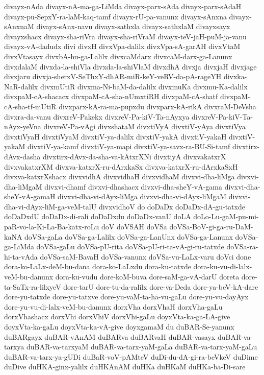 {divayx-nAda
divayx-nA-ma-ga-LiMda
divayx-parx-sAda
divayx-parx-sAdaH
divayx-pu-SepxY-ra-laM-kaq-tamf
divayx-rU-pa-vanunx
divayx-sAnxna
divayx-sAnxnaM
divayx-sAnx-navu
divayx-sathxla
divayx-sathxlaM
divayxsayx
divayxshacx
divayx-sha-riVra
divayx-sha-riVraM
divayx-teV-jaH-puM-ja-vanu
divayx-vA-dadudx
divi
divxH
divxVpa-dalilx
divxVpa-sA-garAH
divxVtaM
divxVtasayx
divxbA-hu-ga-Lalilx
divxcaMdarx
divxcaM-darx-ga-Lanunx
divxdalaM
divxda-la-shiVla
divxda-la-shiVlaM
divxdhA
divxja
divxjaH
divxjage
divxjaru
divxja-sherxV-SeThxY-dhAR-miR-keY-veRV-da-pA-rageYH
divxka-NaR-dalilx
divxmUtiR
divxma-Ni-baM-da-dalilx
divxmuKa
divxmu-Ka-dalilx
divxpaM-cA-shacacx
divxpaM-cA-sha-nUmxtiRH
divxpaM-cA-shatf
divxpaM-cA-sha-tf-mUtiR
divxparx-kA-ra-ma-pupxdu
divxparx-kA-rikA
divxraM-DeVsha
divxra-da-vanu
divxreV-Pakekx
divxreV-Pa-kiV-Ta-nAyxya
divxreV-Pa-kiV-Ta-nAyx-yeVna
divxreV-Pa-vAgi
divxshataM
divxtiVyA
divxtiV-yAya
divxtiVya
divxtiVyaH
divxtiVyaM
divxtiV-ya-dalilx
divxtiV-yakA
divxtiV-yakaH
divxtiV-yakaM
divxtiV-ya-kamf
divxtiV-ya-mapi
divxtiV-ya-savx-ra-BU-Si-tamf
divxtirx-dAvx-dasha
divxtirx-dAvx-da-sha-va-kAtxrXNi
divxtiyA
divxvakatxrX
divxvakatxrXM
divxva-katxrX-ru-dArxkaSx
divxva-katxrX-ru-dArxkaSxH
divxva-katxrXshacx
divxvidhA
divxvidhaH
divxvidhaM
divxvi-dha-liMga
divxvi-dha-liMgaM
divxvi-dhamf
divxvi-dhashacx
divxvi-dha-sheY-vA-gama
divxvi-dha-sheY-vA-gamaH
divxvi-dha-vi-dAyx-liMga
divxvi-dha-vi-dAyx-liMgaM
divxvi-dha-vi-dAyx-liM-ga-veM-talU
divxvidhoV
do
doDaDx
doDaDx-dA-gu-tatxde
doDaDxdU
doDaDx-di-rali
doDaDxdu
doDaDx-vanU
doLA
doLo-Lu-gaM-pu-mi-paR-vo-la-Ki-La-Ba-katx-roLu
doV
doVSAH
doVSa
doVSa-BoV-gi-ga-ru-DaM-kaNA
doVSa-gaLa
doVSa-ga-Lalilx
doVSa-ga-LanUnx
doVSa-ga-Lanunx
doVSa-ga-LiMda
doVSa-gaLu
doVSa-pU-rita
doVSa-pU-ri-ta-vA-gi-ru-tatxde
doVSa-ra-hi-ta-vAda
doVSa-saM-BavaH
doVSa-vanunx
doVSa-vu-LaLx-varu
doVci
done
dora-ko-LaLx-deM-bu-dana
dora-ko-LaLxdu
dora-ku-tatxde
dora-ku-vu-di-lalx-veM-bu-danunx
dora-ku-vudu
dore-koM-buva
dore-saM-ga-vA-darU
doreta
dore-ta-SaTx-ra-lilxyeV
dore-tarU
dore-tu-da-ralilx
dore-va-Deda
dore-ya-beV-kA-dare
dore-yu-tatxde
dore-yu-tatxve
dore-yu-vaM-ta-ha-vu-gaLu
dore-yu-vu-dayAyx
dore-yu-vu-di-lalx-veM-bu-danunx
dorxVha
dorxVhaH
dorxVha-gaLu
dorxVhashacx
dorxVhi
dorxVhiV
dorxVhi-gaLu
doyxVta-ka-ga-LA-give
doyxVta-ka-gaLu
doyxVta-ka-vA-give
doyxgamaM
du
duBAR-Se-yanunx
duBARgayx
duBAR-vAnAM
duBARva
duBARvaH
duBAR-vasayx
duBAR-va-tarxya
duBAR-va-tarxyaM
duBAR-va-tarx-yaM-gaLa
duBAR-va-tarx-yaM-gaLu
duBAR-va-tarx-ya-gUDi
duBaR-voV-pAMteV
duDi-du-dA-gi-ra-beVkeV
duDime
duDive
duHKA-ginx-yalilx
duHKAnAM
duHKa
duHKaM
duHKa-ba-Di-sare
}
